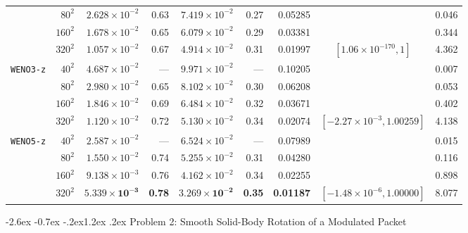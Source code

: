 \documentclass[11pt,a4paper]{article}
\makeatletter
\renewcommand{\section}{\@startsection{section}{1}{\z@}%
  {-2.6ex \@plus -0.7ex \@minus -.2ex}{1.2ex \@plus .2ex}%
  {\normalfont\large\bfseries\color{specnavy}}}
\newcommand{\code}[1]{\texttt{#1}}
\theoremstyle{definition}
\makeatother
\begin{document}
\begin{table}[h]
\begin{tabular}{@{}lrrrrrrcr@{}}
                 & $80^2$  & $2.628\times 10^{-2}$ & 0.63 & $7.419\times 10^{-2}$ & 0.27 & 0.05285 & & 0.046 \\
                 & $160^2$ & $1.678\times 10^{-2}$ & 0.65 & $6.079\times 10^{-2}$ & 0.29 & 0.03381 & & 0.344 \\
                 & $320^2$ & $1.057\times 10^{-2}$ & 0.67 & $4.914\times 10^{-2}$ & 0.31 & 0.01997 & $[1.06\times 10^{-170}, 1]$ & 4.362 \\
\midrule
\code{WENO3-z}   & $40^2$  & $4.687\times 10^{-2}$ & ---  & $9.971\times 10^{-2}$ & ---  & 0.10205 & & 0.007 \\
                 & $80^2$  & $2.980\times 10^{-2}$ & 0.65 & $8.102\times 10^{-2}$ & 0.30 & 0.06208 & & 0.053 \\
                 & $160^2$ & $1.846\times 10^{-2}$ & 0.69 & $6.484\times 10^{-2}$ & 0.32 & 0.03671 & & 0.402 \\
                 & $320^2$ & $1.120\times 10^{-2}$ & 0.72 & $5.130\times 10^{-2}$ & 0.34 & 0.02074 & $[-2.27\times 10^{-3}, 1.00259]$ & 4.138 \\
\midrule
\code{WENO5-z}   & $40^2$  & $2.587\times 10^{-2}$ & ---  & $6.524\times 10^{-2}$ & ---  & 0.07989 & & 0.015 \\
                 & $80^2$  & $1.550\times 10^{-2}$ & 0.74 & $5.255\times 10^{-2}$ & 0.31 & 0.04280 & & 0.116 \\
                 & $160^2$ & $9.138\times 10^{-3}$ & 0.76 & $4.162\times 10^{-2}$ & 0.34 & 0.02255 & & 0.898 \\
                 & $320^2$ & $\mathbf{5.339\times 10^{-3}}$ & \textbf{0.78} & $\mathbf{3.269\times 10^{-2}}$ & \textbf{0.35} & \textbf{0.01187} & $[-1.48\times 10^{-6}, 1.00000]$ & 8.077 \\
\bottomrule
\end{tabular}
\end{table}

\clearpage
\section{Problem 2: Smooth Solid-Body Rotation of a Modulated Packet}
\end{document}
